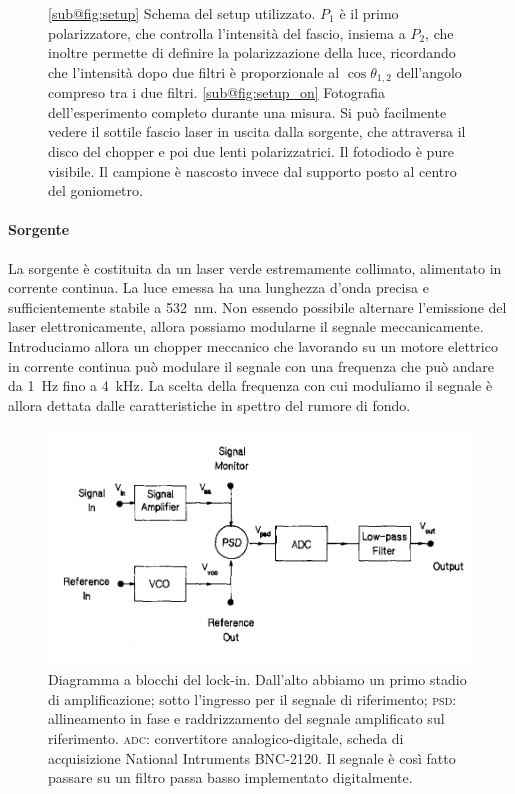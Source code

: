 \documentclass[prb,showpacs,floatfix,altaffilletter,amsmath,amssymb,reprint,citeautoscript,showkeys]{revtex4-1}
\begin{document}
\begin{figure}
    \centering
    \caption{\ref{sub@fig:setup} Schema del setup utilizzato. $P_1$ è il primo polarizzatore, che controlla l'intensità del fascio, insiema a $P_2$, che inoltre permette di definire la polarizzazione della luce, ricordando che l'intensità dopo due filtri è proporzionale al $\cos\theta_{1,2}$ dell'angolo compreso tra i due filtri. \ref{sub@fig:setup_on} Fotografia dell'esperimento completo durante una misura. Si può facilmente vedere il sottile fascio laser in uscita dalla sorgente, che attraversa il disco del chopper e poi due lenti polarizzatrici. Il fotodiodo è pure visibile. Il campione è nascosto invece dal supporto posto al centro del goniometro. }
    \label{fig:setup_and_photo}
\end{figure}

\paragraph*{Sorgente} La sorgente è costituita da un laser verde estremamente collimato, alimentato in corrente continua. La luce emessa ha una lunghezza d'onda precisa e sufficientemente stabile a \SI{532}{\nano\metre}. Non essendo possibile alternare l'emissione del laser elettronicamente, allora possiamo modularne il segnale meccanicamente. Introduciamo allora un chopper meccanico che lavorando su un motore elettrico in corrente continua può modulare il segnale con una frequenza che può andare da \SI{1}{\hertz} fino a \SI{4}{\kilo\hertz}. La scelta della frequenza con cui moduliamo il segnale è allora dettata dalle caratteristiche in spettro del rumore di fondo. 

\begin{figure}
    \centering
    \includegraphics[width=\linewidth]{figures/block_diagram.png}
    \caption{Diagramma a blocchi del lock-in. Dall'alto abbiamo un primo stadio di amplificazione; sotto l'ingresso per il segnale di riferimento; \textsc{psd}: allineamento in fase e raddrizzamento del segnale amplificato sul riferimento. \textsc{adc}: convertitore analogico-digitale, scheda di acquisizione National Intruments BNC-2120. Il segnale è così fatto passare su un filtro passa basso implementato digitalmente. }
    \label{fig:lock-in/block_diagram}
\end{figure}
\end{document}
